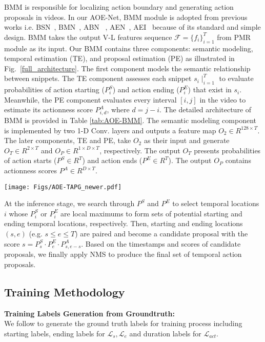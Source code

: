 \documentclass[sn-mathphys]{sn-jnl}
\theoremstyle{thmstyleone}\newtheorem{theorem}{Theorem}\newtheorem{proposition}[theorem]{Proposition}
\theoremstyle{thmstyletwo}\newtheorem{example}{Example}\newtheorem{remark}{Remark}
\theoremstyle{thmstylethree}\newtheorem{definition}{Definition}
\begin{document}
BMM is responsible for localizing action boundary and generating action proposals in videos. In our AOE-Net, BMM module is adopted from previous works i.e. BSN~\cite{lin2018bsn}, BMN~\cite{bmn}, ABN ~\cite{KhoaVo_ICASSP}, AEN~\cite{KhoaVo_Access}, AEI~\cite{khoavo_aei_bmvc21} because of its standard and simple design. BMM takes the output V-L features sequence $\mathcal{F} = \{ f_i\}_{i=1}^T$ from PMR module as its input. Our BMM contains three components: semantic modeling, temporal estimation (TE), and proposal estimation (PE) as illustrated in Fig.~\ref{full_architecture}. The first component models the semantic relationship between snippets. The TE component assesses each snippet $s_i\mid_{i=1}^T$ to evaluate probabilities of action starting ($P^S_i$) and action ending ($P^E_i$) that exist in $s_i$. Meanwhile, the PE component evaluates every interval $[i,j]$ in the video to estimate its actionness score $P^A_{i,d}$, where $d=j-i$. The detailed architecture of BMM is provided in Table \ref{tab:AOE-BMM}. The semantic modeling component is implemented by two 1-D Conv. layers and outputs a feature map $O_2 \in R^{128 \times T}$. The later components, TE and PE, take $O_2$ as their input and generate $O_T \in R^{2 \times T}$ and $O_P \in R^{1 \times D \times T}$, respectively. The output $O_T$ presents probabilities of action starts ($P^S \in R^T$) and action ends ($P^E \in R^T$). The output $O_P$ contains actionness scores $P^A \in R^{D\times T}$.


\begin{figure*}[t]
\centering
  \texttt{[image: Figs/AOE-TAPG\_newer.pdf]}
  \caption{The overall architecture of our proposed AOE-Net, consisting of perception-based multi-model representation module (PMR) and boundary-matching module (BMM).} \label{full_architecture}
\end{figure*}


At the inference stage, we search through $P^S$ and $P^E$ to select temporal locations $i$ whose $P^S_i$ or $P^E_i$ are local maximums to form sets of potential starting and ending temporal locations, respectively. Then, starting and ending locations $(s, e)$ (e.g. $s\leq e \leq T$) are paired and become a candidate proposal with the score $s=P^S_s \cdot P^E_e \cdot P^A_{s, e-s}$. 
Based on the timestamps and scores of candidate proposals, we finally apply NMS \cite{SoftNMS, NMS} to produce the final set of temporal action proposals.




\subsection{Training Methodology}
\label{subsec:train_method}
\noindent\textbf{Training Labels Generation from Groundtruth:}\\
We follow \cite{bmn, lin2018bsn} to generate the ground truth labels for training process including starting labels, ending labels for $\mathcal{L}_s, \mathcal{L}_e$ and duration labels for $\mathcal{L}_{act}$.
\end{document}
